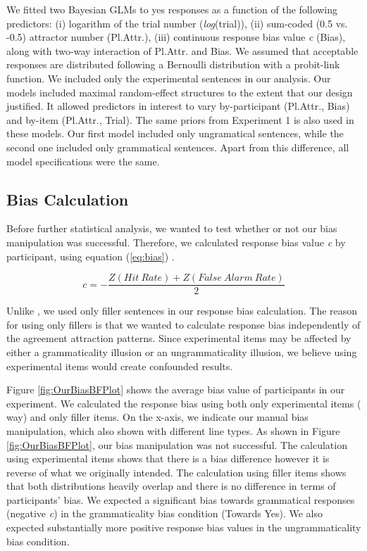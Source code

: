 We fitted two Bayesian GLMs to yes responses as a function of the following predictors: (i) logarithm of the trial number (\emph{log}(trial)), (ii) sum-coded (0.5 vs. -0.5) attractor number (Pl.Attr.), (iii) continuous response bias value \emph{c} (Bias), along with two-way interaction of Pl.Attr. and Bias. We assumed that acceptable responses are distributed following a Bernoulli distribution with a probit-link function. We included only the experimental sentences in our analysis. Our models included maximal random-effect structures to the extent that our design justified. It allowed predictors in interest to vary by-participant (Pl.Attr., Bias) and by-item (Pl.Attr., Trial). The same priors from Experiment 1 is also used in these models. Our first model included only ungramatical sentences, while the second one included only grammatical sentences. Apart from this difference, all model specifications were the same.

\subsection{Bias Calculation} \label{sec:bias}

Before further statistical analysis, we wanted to test whether or not our bias manipulation was successful. Therefore, we calculated response bias value \emph{c} by participant, using equation (\ref{eq:bias}) \citep{MacmillanCreelman2005}. 

\begin{equation} \label{eq:bias}
c = -\frac{Z(Hit{\ }Rate)+Z(False{\ }Alarm{\ }Rate)}{2}
\end{equation}

Unlike , we used only filler sentences in our response bias calculation. The reason for using only fillers is that we wanted to calculate response bias independently of the agreement attraction patterns. Since experimental items may be affected by either a grammaticality illusion or an ungrammaticality illusion, we believe using experimental items would create confounded results.

Figure \ref{fig:OurBiasBFPlot} shows the average bias value of participants in our experiment. We calculated the response bias using both only experimental items (\cites{HammerlyEtAl2019} way) and only filler items. On the x-axis, we indicate our manual bias manipulation, which also shown with different line types. As shown in Figure \ref{fig:OurBiasBFPlot}, our bias manipulation was not successful. The calculation using experimental items shows that there is a bias difference however it is reverse of what we originally intended. The calculation using filler items shows that both distributions heavily overlap and there is no difference in terms of participants' bias. We expected a significant bias towards grammatical responses (negative \emph{c}) in the grammaticality bias condition (Towards Yes). We also expected substantially more positive response bias values in the ungrammaticality bias condition. 


